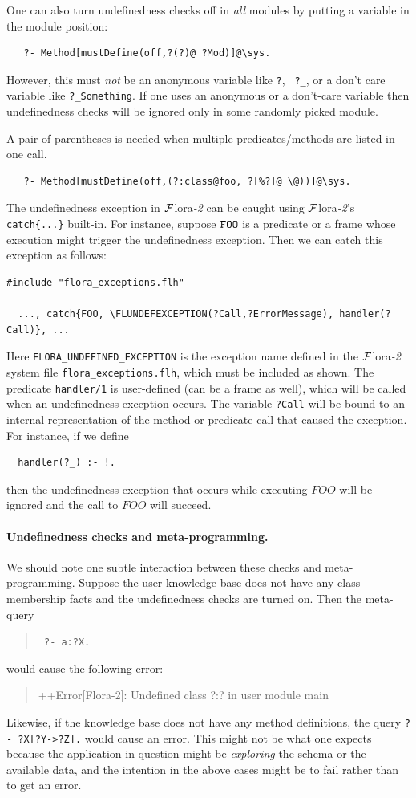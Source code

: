 \documentclass[11pt]{article}
\newcommand{\FLORA}{{\mbox{\sc ${\cal F}${lora}\rm\emph{-2}}}\xspace}
\newcommand{\FLSYSTEM}{\FLORA}
\newcommand{\FLUNDEFEXCEPTION}{FLORA\_UNDEFINED\_EXCEPTION}
\newcommand{\errorsystem}{Flora-2}
\begin{document}
One can also turn undefinedness checks off in \emph{all} modules by putting a
variable in the module position:
\begin{verbatim}
   ?- Method[mustDefine(off,?(?)@ ?Mod)]@\sys.
\end{verbatim}
However, this must \emph{not} be an anonymous variable like {\tt ?}, {\tt
  ?\_}, or a don't care variable like {\tt ?\_Something}.  If one uses an
anonymous or a don't-care variable then undefinedness checks will be ignored
only in some randomly picked module.

A pair of parentheses is needed when multiple
predicates/methods are listed in one call.
\begin{verbatim}
   ?- Method[mustDefine(off,(?:class@foo, ?[%?]@ \@))]@\sys.
\end{verbatim}

The undefinedness exception in \FLSYSTEM can be caught using \FLSYSTEM's {\tt
  catch\{...\}} built-in. For instance, suppose
$\tt FOO$ is a predicate or a frame whose execution might trigger the
undefinedness exception. Then we can catch this exception as follows:
\begin{verbatim}
#include "flora_exceptions.flh"

  ..., catch{FOO, \FLUNDEFEXCEPTION(?Call,?ErrorMessage), handler(?Call)}, ...
\end{verbatim}
Here {\tt \FLUNDEFEXCEPTION} is the exception name defined in the
\FLSYSTEM system file {\tt flora\_exceptions.flh}, which must be included as
shown.
The predicate {\tt handler/1} is user-defined (can be a frame as well),
which will be called when an undefinedness exception occurs. The variable
{\tt ?Call} will be bound to an internal representation of the method or
predicate call that caused the exception. For instance, if we define
\begin{verbatim}
  handler(?_) :- !.  
\end{verbatim}
then the undefinedness exception that occurs while executing $FOO$ will be
ignored and the call to $FOO$ will succeed.


\paragraph{Undefinedness checks and meta-programming.}
We should note one subtle interaction between these checks and
meta-programming. Suppose the user knowledge base does not have any class membership
facts and the undefinedness checks are turned on. Then the meta-query
\begin{quote}
 {\tt
       ?- a:?X.
 }
\end{quote}
would cause the following error:
\begin{quote}
 ++Error[\errorsystem]: Undefined class ?:? in user module main  
\end{quote}
Likewise, if the knowledge base does not have any method definitions,
the query {\tt ?- ?X[?Y->?Z].} would cause an error. This might not
be what one expects because the application in question might be
\emph{exploring} the schema or the available data, and the intention in the
above cases might be to fail rather than to get an error.
\end{document}

